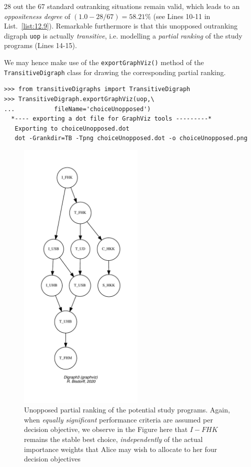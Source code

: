 28 out the 67 standard outranking situations remain valid, which leads to an \emph{oppositeness degree} of $(1.0 - 28/67) = 58.21\%$ (see Lines 10-11 in List.~\vref{list:12.9}). Remarkable furthermore is that this unopposed outranking digraph \texttt{uop} is actually \emph{transitive}, i.e. modelling a \emph{partial ranking} of the study programs (Lines 14-15).

We may hence make use of the \texttt{exportGraphViz()} method of the \texttt{Transi\-tiveDigraph} class for drawing the corresponding partial ranking.
\begin{lstlisting}
>>> from transitiveDigraphs import TransitiveDigraph
>>> TransitiveDigraph.exportGraphViz(uop,\
...           fileName='choiceUnopposed')
  *---- exporting a dot file for GraphViz tools ---------*
   Exporting to choiceUnopposed.dot
   dot -Grankdir=TB -Tpng choiceUnopposed.dot -o choiceUnopposed.png
\end{lstlisting}
\begin{figure}[ht]
\sidecaption[t]
\includegraphics[width=6cm]{Figures/12-7-choiceUnopposed.pdf}
\caption[Unopposed partial ranking of the potential study programs]{Unopposed partial ranking of the potential study programs. Again, when \emph{equally significant} performance criteria are assumed per decision objective, we observe in the Figure here that $I-FHK$ remains the stable best choice, \emph{independently} of the actual importance weights that Alice may wish to allocate to her four decision objectives}
\label{fig:12.7}       %
\end{figure}


